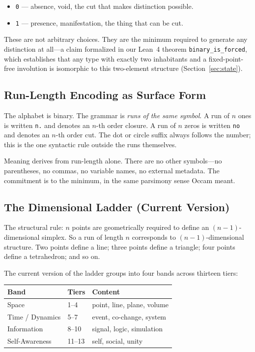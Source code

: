 \documentclass[12pt]{article}
\begin{document}
\begin{itemize}[leftmargin=*, itemsep=0.3em]
    \item \texttt{0} --- absence, void, the cut that makes distinction possible.
    \item \texttt{1} --- presence, manifestation, the thing that can be cut.
\end{itemize}

These are not arbitrary choices. They are the minimum required to generate any distinction at all---a claim formalized in our Lean~4 theorem \texttt{binary\_is\_forced}, which establishes that any type with exactly two inhabitants and a fixed-point-free involution is isomorphic to this two-element structure (Section~\ref{sec:state}).

\subsection{Run-Length Encoding as Surface Form}
\label{subsec:rle}

The alphabet is binary. The grammar is \emph{runs of the same symbol}. A run of $n$ ones is written \texttt{n.} and denotes an $n$-th order closure. A run of $n$ zeros is written \texttt{no} and denotes an $n$-th order cut. The dot or circle suffix always follows the number; this is the one syntactic rule outside the runs themselves.

Meaning derives from run-length alone. There are no other symbols---no parentheses, no commas, no variable names, no external metadata. The commitment is to the minimum, in the same parsimony sense Occam meant.

\subsection{The Dimensional Ladder (Current Version)}
\label{subsec:ladder}

The structural rule: $n$ points are geometrically required to define an $(n-1)$-dimensional simplex. So a run of length $n$ corresponds to $(n-1)$-dimensional structure. Two points define a line; three points define a triangle; four points define a tetrahedron; and so on.

The current version of the ladder groups into four bands across thirteen tiers:

\begin{center}
\begin{tabular}{@{}lll@{}}
\toprule
\textbf{Band} & \textbf{Tiers} & \textbf{Content} \\
\midrule
Space            & 1--4   & point, line, plane, volume \\
Time / Dynamics  & 5--7   & event, co-change, system \\
Information      & 8--10  & signal, logic, simulation \\
Self-Awareness   & 11--13 & self, social, unity \\
\bottomrule
\end{tabular}
\end{center}
\end{document}
